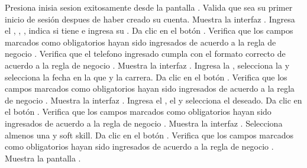 \begin{UCtrayectoria}
	\UCpaso [\UCactor] Presiona inisia sesion exitosamente desde la pantalla .
    \UCpaso [\UCsist] Valida que sea su primer inicio de sesión despues de haber creado su cuenta.
	\UCpaso [\UCsist] Muestra la interfaz .
	\UCpaso [\UCactor] Ingresa el , , , 
	indica si tiene  e ingresa su .\label{USRCU01-grl1}
	\UCpaso [\UCactor] Da clic en el botón .
	\UCpaso [\UCsist] Verifica que los campos marcados como obligatorios hayan sido ingresados de acuerdo a la
	regla de negocio .
	\UCpaso [\UCsist] Verifica que el telefono ingresado cumpla con el formato correcto de acuerdo a la regla de negocio  .  
	\UCpaso [\UCsist] Muestra la interfaz .
	\UCpaso [\UCactor] Ingresa la , selecciona la  y selecciona
	la fecha en la que  y  la carrera.
	\UCpaso [\UCactor] Da clic en el botón .
	\UCpaso [\UCsist] Verifica que los campos marcados como obligatorios hayan sido ingresados de acuerdo a la
	regla de negocio .\label{USRCU01-grl2} 
	\UCpaso [\UCsist] Muestra la interfaz .
	\UCpaso [\UCactor] Ingresa el  , el  y selecciona
	el   deseado.
	\UCpaso [\UCactor] Da clic en el botón .
	\UCpaso [\UCsist] Verifica que los campos marcados como obligatorios hayan sido ingresados de acuerdo a la
	regla de negocio .\label{USRCU01-grl3} 
	\UCpaso [\UCsist] Muestra la interfaz .
	\UCpaso [\UCactor] Selecciona almenos una  y soft skill.
	\UCpaso [\UCactor] Da clic en el botón .
	\UCpaso [\UCsist] Verifica que los campos marcados como obligatorios hayan sido ingresados de acuerdo a la
	regla de negocio .\label{USRCU01-grl4} 
	\UCpaso [\UCsist] Muestra la pantalla . %
\end{UCtrayectoria}

